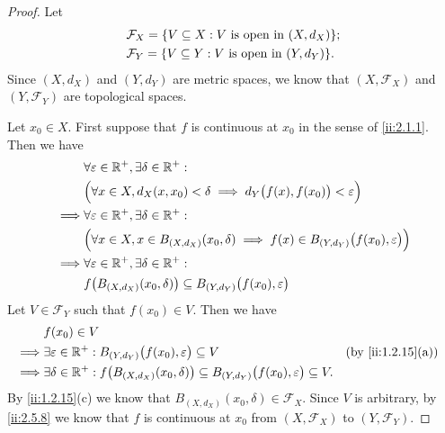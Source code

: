 \begin{proof}
  Let
  \begin{align*}
     & \mathcal{F}_X = \set{V \subseteq X : V \text{ is open in } (X, d_X)}; \\
     & \mathcal{F}_Y = \set{V \subseteq Y : V \text{ is open in } (Y, d_Y)}.
  \end{align*}
  Since \((X, d_X)\) and \((Y, d_Y)\) are metric spaces, we know that \((X, \mathcal{F}_X)\) and \((Y, \mathcal{F}_Y)\) are topological spaces.

  Let \(x_0 \in X\).
  First suppose that \(f\) is continuous at \(x_0\) in the sense of \cref{ii:2.1.1}.
  Then we have
  \begin{align*}
             & \forall \varepsilon \in \mathbb{R}^+, \exists \delta \in \mathbb{R}^+ :                                                                \\
             & \Big(\forall x \in X, d_X(x, x_0) < \delta \implies d_Y\big(f(x), f(x_0)\big) < \varepsilon\Big)                       \\
    \implies & \forall \varepsilon \in \mathbb{R}^+, \exists \delta \in \mathbb{R}^+ :                                                                \\
             & \Big(\forall x \in X, x \in B_{(X, d_X)}(x_0, \delta) \implies f(x) \in B_{(Y, d_Y)}\big(f(x_0), \varepsilon\big)\Big) \\
    \implies & \forall \varepsilon \in \mathbb{R}^+, \exists \delta \in \mathbb{R}^+ :                                                                \\
             & f\big(B_{(X, d_X)}(x_0, \delta)\big) \subseteq B_{(Y, d_Y)}\big(f(x_0), \varepsilon\big)
  \end{align*}
  Let \(V \in \mathcal{F}_Y\) such that \(f(x_0) \in V\).
  Then we have
  \begin{align*}
             & f(x_0) \in V                                                                                                                                        \\
    \implies & \exists \varepsilon \in \R^+ : B_{(Y, d_Y)}\big(f(x_0), \varepsilon\big) \subseteq V                                            &  & \by{ii:1.2.15}[a] \\
    \implies & \exists \delta \in \R^+ : f\big(B_{(X, d_X)}(x_0, \delta)\big) \subseteq B_{(Y, d_Y)}\big(f(x_0), \varepsilon\big) \subseteq V.
  \end{align*}
  By \cref{ii:1.2.15}(c) we know that \(B_{(X, d_X)}(x_0, \delta) \in \mathcal{F}_X\).
  Since \(V\) is arbitrary, by \cref{ii:2.5.8} we know that \(f\) is continuous at \(x_0\) from \((X, \mathcal{F}_X)\) to \((Y, \mathcal{F}_Y)\).


\end{proof}
